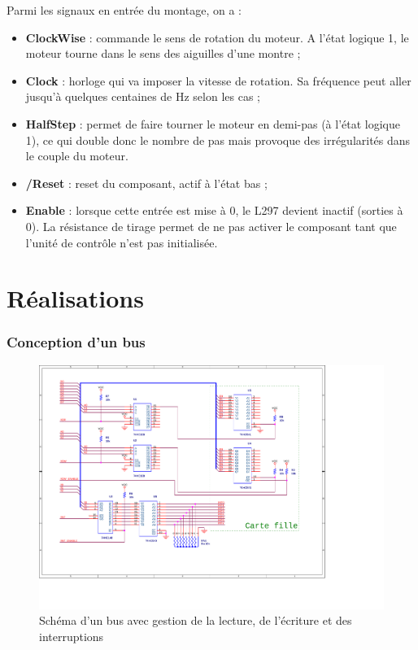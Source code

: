 \documentclass[a4paper]{article}
\begin{document}
Parmi les signaux en entrée du montage, on a :

\begin{itemize}
	\item \textbf{ClockWise} : commande le sens de rotation du moteur. A l'état logique 1, le moteur tourne dans le sens des aiguilles d'une montre ;
	\item \textbf{Clock} : horloge qui va imposer la vitesse de rotation. Sa fréquence peut aller jusqu'à quelques centaines de Hz selon les cas ;
	\item \textbf{HalfStep} : permet de faire tourner le moteur en demi-pas (à l'état logique 1), ce qui double donc le nombre de pas mais provoque des irrégularités dans le couple du moteur.
	\item \textbf{/Reset} : reset du composant, actif à l'état bas ;
	\item \textbf{Enable} : lorsque cette entrée est mise à 0, le L297 devient inactif (sorties à 0). La résistance de tirage permet de ne pas activer le composant tant que l'unité de contrôle n'est pas initialisée.
\end{itemize}

\part{Réalisations}

\section{Conception d'un bus}

\begin{figure}[H]
	\centering
	\includegraphics[scale=1.00, angle=90]{Images/Montage_bus}
	\caption{Schéma d'un bus avec gestion de la lecture, de l'écriture et des interruptions
		\label{Montage_bus}}
\end{figure}
\end{document}
